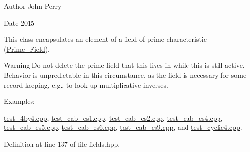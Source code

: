 \begin{DoxyAuthor}{Author}
John Perry 
\end{DoxyAuthor}
\begin{DoxyDate}{Date}
2015
\end{DoxyDate}
This class encapsulates an element of a field of prime characteristic (\hyperlink{group___fields_group_class_prime___field}{Prime\+\_\+\+Field}).

\begin{DoxyWarning}{Warning}
Do not delete the prime field that {\ttfamily this} lives in while {\ttfamily this} is still active. Behavior is unpredictable in this circumstance, as the field is necessary for some record keeping, e.\+g., to look up multiplicative inverses. 
\end{DoxyWarning}
\begin{Desc}
\item[Examples\+: ]\par
\hyperlink{test_4by4_8cpp-example}{test\+\_\+4by4.\+cpp}, \hyperlink{test_cab_es1_8cpp-example}{test\+\_\+cab\+\_\+es1.\+cpp}, \hyperlink{test_cab_es2_8cpp-example}{test\+\_\+cab\+\_\+es2.\+cpp}, \hyperlink{test_cab_es4_8cpp-example}{test\+\_\+cab\+\_\+es4.\+cpp}, \hyperlink{test_cab_es5_8cpp-example}{test\+\_\+cab\+\_\+es5.\+cpp}, \hyperlink{test_cab_es6_8cpp-example}{test\+\_\+cab\+\_\+es6.\+cpp}, \hyperlink{test_cab_es9_8cpp-example}{test\+\_\+cab\+\_\+es9.\+cpp}, and \hyperlink{test_cyclic4_8cpp-example}{test\+\_\+cyclic4.\+cpp}.\end{Desc}


Definition at line 137 of file fields.\+hpp.

